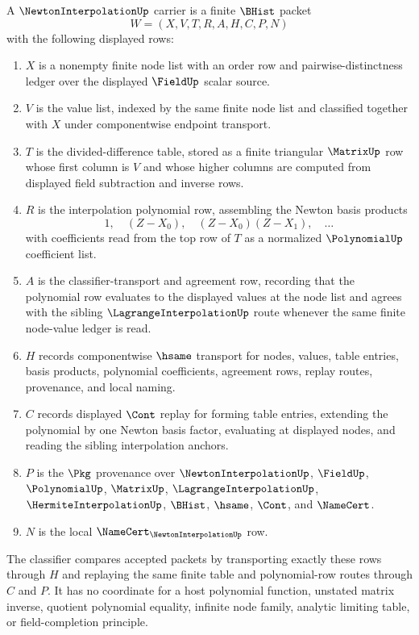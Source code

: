 \begin{definition}
\label{def:newton-interpolation-carrier}
A $\NewtonInterpolationUp$ carrier is a finite $\BHist$ packet
$$
W=(X,V,T,R,A,H,C,P,N)
$$
with the following displayed rows:
\begin{enumerate}
\item $X$ is a nonempty finite node list with an order row and pairwise-distinctness ledger over the displayed $\FieldUp$ scalar source.
\item $V$ is the value list, indexed by the same finite node list and classified together with $X$ under componentwise endpoint transport.
\item $T$ is the divided-difference table, stored as a finite triangular $\MatrixUp$ row whose first column is $V$ and whose higher columns are computed from displayed field subtraction and inverse rows.
\item $R$ is the interpolation polynomial row, assembling the Newton basis products
$$
1,\quad (Z-X_0),\quad (Z-X_0)(Z-X_1),\quad \ldots
$$
with coefficients read from the top row of $T$ as a normalized $\PolynomialUp$ coefficient list.
\item $A$ is the classifier-transport and agreement row, recording that the polynomial row evaluates to the displayed values at the node list and agrees with the sibling $\LagrangeInterpolationUp$ route whenever the same finite node-value ledger is read.
\item $H$ records componentwise $\hsame$ transport for nodes, values, table entries, basis products, polynomial coefficients, agreement rows, replay routes, provenance, and local naming.
\item $C$ records displayed $\Cont$ replay for forming table entries, extending the polynomial by one Newton basis factor, evaluating at displayed nodes, and reading the sibling interpolation anchors.
\item $P$ is the $\Pkg$ provenance over $\NewtonInterpolationUp$, $\FieldUp$, $\PolynomialUp$, $\MatrixUp$, $\LagrangeInterpolationUp$, $\HermiteInterpolationUp$, $\BHist$, $\hsame$, $\Cont$, and $\NameCert$.
\item $N$ is the local $\NameCert_{\NewtonInterpolationUp}$ row.
\end{enumerate}
The classifier compares accepted packets by transporting exactly these rows through $H$ and replaying the same finite table and polynomial-row routes through $C$ and $P$. It has no coordinate for a host polynomial function, unstated matrix inverse, quotient polynomial equality, infinite node family, analytic limiting table, or field-completion principle.
\end{definition}

